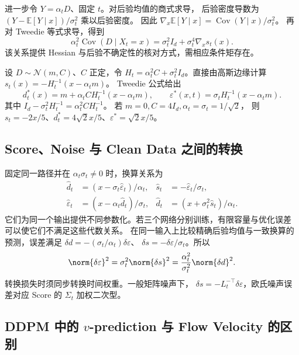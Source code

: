 进一步令 \(Y=\alpha_tD\)、固定 \(t\)。对后验均值的商式求导，
后验密度导数为 \((Y-\mathbb E[Y\mid x])/\sigma_t^2\) 乘以后验密度。
因此 \(\nabla_x\mathbb E[Y\mid x]=\operatorname{Cov}(Y\mid x)/\sigma_t^2\)。
再对 Tweedie 等式求导，得到
\begin{equation}
 \alpha_t^2\operatorname{Cov}(D\mid X_t=x)
   =\sigma_t^2I_d+\sigma_t^4\nabla_xs_t(x).
 \label{eq:fields-second-tweedie}
\end{equation}
该关系提供 Hessian 与后验不确定性的核对方式，需相应条件矩存在。

\begin{example}[非单位方差数据的去噪]
设 \(D\sim\mathcal N(m,C)\)、\(C\) 正定，令
\(H_t=\alpha_t^2C+\sigma_t^2I_d\)。直接由高斯边缘计算
\(s_t(x)=-H_t^{-1}(x-\alpha_tm)\)。
Tweedie 公式给出
\[
 d_t^*(x)=m+\alpha_t C H_t^{-1}(x-\alpha_tm),\qquad
 \varepsilon^*(x,t)=\sigma_t H_t^{-1}(x-\alpha_tm).
\]
其中 \(I_d-\sigma_t^2H_t^{-1}=\alpha_t^2CH_t^{-1}\)。
若 \(m=0,C=4I_d,\alpha_t=\sigma_t=1/\sqrt2\)，
则 \(s_t=-2x/5\)、\(d_t^*=4\sqrt2x/5\)、\(\varepsilon^*=\sqrt2x/5\)。
\end{example}

\subsection{Score、Noise 与 Clean Data 之间的转换}

固定同一路径并在 \(\alpha_t\sigma_t\ne0\) 时，换算关系为
\begin{equation}
 \begin{aligned}
 \widehat d_t&=(x-\sigma_t\widehat\varepsilon_t)/\alpha_t,
 &\widehat s_t&=-\widehat\varepsilon_t/\sigma_t,\\
 \widehat\varepsilon_t&=(x-\alpha_t\widehat d_t)/\sigma_t,
 &\widehat d_t&=(x+\sigma_t^2\widehat s_t)/\alpha_t.
 \end{aligned}
 \label{eq:fields-three-parameterizations}
\end{equation}
它们为同一个输出提供不同参数化。若三个网络分别训练，有限容量与优化误差
可以使它们不满足这些代数关系。
在同一输入上比较精确后验均值与一致换算的预测，误差满足
\(\delta d=-(\sigma_t/\alpha_t)\delta\varepsilon\)、
\(\delta s=-\delta\varepsilon/\sigma_t\)。所以
\[
 \norm{\delta\varepsilon}^2
 =\sigma_t^2\norm{\delta s}^2
 =\frac{\alpha_t^2}{\sigma_t^2}\norm{\delta d}^2.
\]
转换损失时须同步转换时间权重。一般矩阵噪声下，
\(\delta s=-L_t^{-\top}\delta\varepsilon\)，欧氏噪声误差对应
Score 的 \(\Sigma_t\) 加权二次型。

\subsection{DDPM 中的 \texorpdfstring{\(v\)}{v}-prediction 与 Flow Velocity 的区别}

